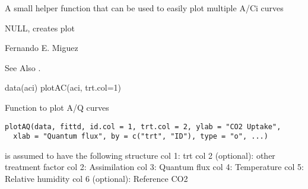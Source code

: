 \documentclass[letterpaper]{book}
\begin{document}
%
\begin{Details}\relax
A small helper function that can be used to easily plot
multiple A/Ci curves
\end{Details}
%
\begin{Value}
NULL, creates plot
\end{Value}
%
\begin{Author}\relax
Fernando E. Miguez
\end{Author}
%
\begin{SeeAlso}\relax
See Also .
\end{SeeAlso}
%
\begin{Examples}
\begin{ExampleCode}
data(aci)
plotAC(aci, trt.col=1)
\end{ExampleCode}
\end{Examples}
%
\begin{Description}\relax
Function to plot A/Q curves
\end{Description}
%
\begin{Usage}
\begin{verbatim}
plotAQ(data, fittd, id.col = 1, trt.col = 2, ylab = "CO2 Uptake",
  xlab = "Quantum flux", by = c("trt", "ID"), type = "o", ...)
\end{verbatim}
\end{Usage}
%
\begin{Arguments}
\begin{ldescription}
\item[\code{data}] is assumed to have the following structure
col 1: trt col 2 (optional): other treatment factor col
2: Assimilation col 3: Quantum flux col 4: Temperature
col 5: Relative humidity col 6 (optional): Reference CO2

\item[\code{fittd}] 

\item[\code{id.col}] 

\item[\code{trt.col}] 

\item[\code{ylab}] 

\item[\code{xlab}] 

\item[\code{by}] 

\item[\code{type}] 

\item[\code{...}] 
\end{ldescription}
\end{Arguments}
\end{document}
